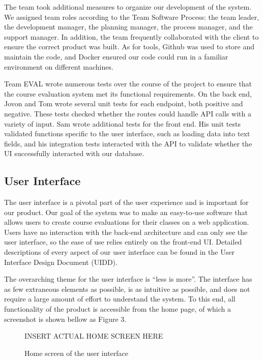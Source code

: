\documentclass{article}
\begin{document}
The team took additional measures to organize our development of the system. We assigned team roles according to the Team Software Process: the team leader, the development manager, the planning manager, the process manager, and the support manager. In addition, the team frequently collaborated with the client to ensure the correct product was built. As for tools, Github was used to store and maintain the code, and Docker ensured our code could run in a familiar environment on different machines.

Team EVAL wrote numerous tests over the course of the project to ensure that the course evaluation system met its functional requirements. On the back end, Jovon and Tom wrote several unit tests for each endpoint, both positive and negative. These tests checked whether the routes could handle API calls with a variety of input. Sam wrote additional tests for the front end. His unit tests validated functions specific to the user interface, such as loading data into text fields, and his integration tests interacted with the API to validate whether the UI successfully interacted with our database.

\subsection{User Interface}

The user interface is a pivotal part of the user experience and is important for our product. Our goal of the system was to make an easy-to-use software that allows users to create course evaluations for their classes on a web application. Users have no interaction with the back-end architecture and can only see the user interface, so the ease of use relies entirely on the front-end UI. Detailed descriptions of every aspect of our user interface can be found in the User Interface Design Document (UIDD). 

The overarching theme for the user interface is ``less is more''.  The interface has as few extraneous elements as possible, is as intuitive as possible, and does not require a large amount of effort to understand the system. To this end, all functionality of the product is accessible from the home page, of which a screenshot is shown bellow as Figure 3.

\begin{center}
\begin{figure}[H]
    \centering
    INSERT ACTUAL HOME SCREEN HERE
    \caption{Home screen of the user interface}
\end{figure}
\end{center}
\end{document}
